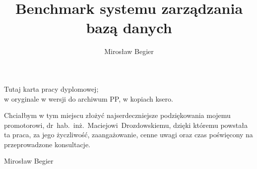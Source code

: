 \documentclass[polish,a4paper,oneside]{../fcm-unofficial/ppfcmthesis}
\author{Mirosław Begier}
\title{Benchmark systemu zarządzania bazą danych}
\begin{document}
\maketitle\cleardoublepage%
\thispagestyle{empty}\vspace*{\fill}\noindent\begin{center}%
Tutaj karta pracy dyplomowej;\\w oryginale w wersji do archiwum PP, w kopiach ksero.\end{center}\vfill\cleardoublepage%

\thispagestyle{empty}\vspace*{15cm}%
\hfill\begin{minipage}{.7\linewidth}
Chciałbym w tym miejscu złożyć najserdeczniejsze podziękowania mojemu promotorowi, 
dr~hab.~inż.~Maciejowi~Drozdowskiemu, dzięki któremu powstała ta praca, za jego
życzliwość, zaangażowanie, cenne uwagi oraz czas poświęcony na przeprowadzone konsultacje.

\noindent\flushright Mirosław Begier
\end{minipage}
\cleardoublepage%

\frontmatter{}\cleardoublepage%

\mainmatter%










{\small}

\backmatter%
 
 
\end{document}
